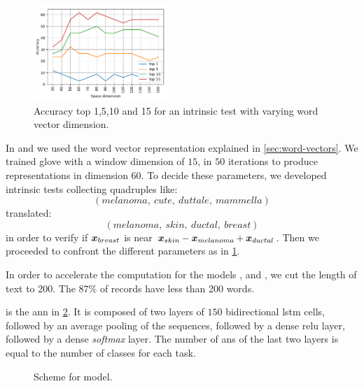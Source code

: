 \begin{figure}
  \centering
  \includegraphics[width=0.45\textwidth]{img/gloveParameter.pdf}
  \caption{Accuracy top 1,5,10 and 15 for an intrinsic test with
    varying word vector dimension.}
  \label{fig:gloveParameter}
\end{figure}
In \lstmb{} and \lstmc{} we used the word vector representation
explained in \cref{sec:word-vectors}. We trained \ac{glove} with a window dimension of $15$,
in $50$ iterations to produce representations in dimension $60$. To
decide these parameters, we developed intrinsic tests collecting
quadruples like:
$$
(melanoma,\ cute,\ duttale,\ mammella)
$$
translated:
$$
(melanoma,\ skin,\ ductal,\ breast)
$$
in order to verify if $\bm{x}_{breast}$ is near
$\bm{x}_{skin}-\bm{x}_{melanoma}+\bm{x}_{ductal}$. Then we
proceeded to confront the different parameters as in
\cref{fig:gloveParameter}.

In order to accelerate the computation for the models \lstmng{}, \lstmb{}
and \lstmc{}, we cut the length of text to 200. The
$87\%$ of records have less than 200 words.

\lstmng{} is the \ac{ann} in \cref{fig:schemeLstmng}. It is
composed of two layers of $150$ bidirectional \ac{lstm} cells,
followed by an average pooling of the sequences, followed by a
dense \ac{relu} layer, followed by a dense \emph{softmax} layer.
The number of \acp{an} of the last two layers is
equal to the number of classes for each task.
\begin{figure}
  \centering
  \caption{Scheme for \lstmng{} model.}
  \label{fig:schemeLstmng}
\end{figure}

